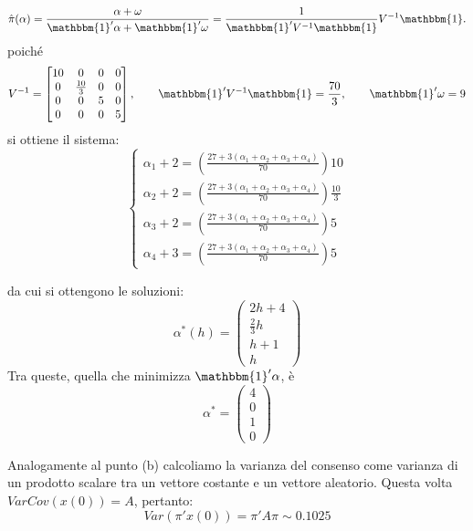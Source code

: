 \begin{alphaparts}
    \[\hat{\pi}(\alpha) = \frac{\alpha+ \omega}{\mathbbm{1}'\alpha+\mathbbm{1}'\omega} = \frac{1}{\mathbbm{1}'V^{-1}\mathbbm{1}}V^{-1}\mathbbm{1}. \]
    poiché
    \[V^{-1} = \begin{bmatrix}
        10 & 0 & 0 & 0 \\
        0 & \frac{10}{3} & 0 & 0 \\
        0 & 0 & 5 & 0\\
        0 & 0 & 0 & 5
    \end{bmatrix}, \quad\quad \mathbbm{1}'V^{-1}\mathbbm{1} = \frac{70}{3}, \quad\quad \mathbbm{1}'\omega = 9 \]
    si ottiene il sistema:
    \[\begin{cases}
        \alpha_1 + 2 = \left(\frac{27+ 3(\alpha_1 + \alpha_2 + \alpha_3 + \alpha_4)}{70}\right)10\\
        \alpha_2 + 2 = \left(\frac{27+ 3(\alpha_1 + \alpha_2 + \alpha_3 + \alpha_4)}{70}\right) \frac{10}{3}\\
        \alpha_3+ 2 = \left(\frac{27+ 3(\alpha_1 + \alpha_2 + \alpha_3 + \alpha_4)}{70}\right) 5\\
        \alpha_4 + 3 = \left(\frac{27+ 3(\alpha_1 + \alpha_2 + \alpha_3 + \alpha_4)}{70}\right) 5
    \end{cases}\]

    da cui si ottengono le soluzioni:
    \[\alpha^*(h) = \begin{pmatrix}
        2h+ 4 \\ \frac{2}{3}h \\ h+ 1 \\ h
    \end{pmatrix}\]
    Tra queste, quella che minimizza \(\mathbbm{1}'\alpha\), è
    \[\alpha^* = \begin{pmatrix}
        4 \\ 0 \\ 1 \\ 0
    \end{pmatrix}\] 

    \questionpart %
    Analogamente al punto (b) calcoliamo la varianza del consenso come varianza di un prodotto scalare tra un vettore costante e un vettore aleatorio. Questa volta \(VarCov(x(0))= A\), pertanto:
    \[Var(\pi'x(0)) = \pi'A\pi \sim 0.1025\]


\end{alphaparts}
